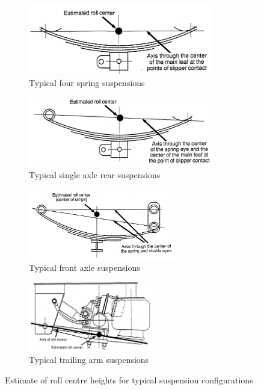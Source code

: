 \begin{figure}
	\centering
	\begin{subfigure}[t]{0.45\textwidth}
		\centering
		\includegraphics[height=1.2in]{fig/winkler-2011_roll-centre-estimation_typical-four-spring-suspensions}
		\caption{Typical four spring suspensions}
	\end{subfigure}%
	\hfill
	\begin{subfigure}[t]{0.45\textwidth}
		\centering
		\includegraphics[height=1.2in]{fig/winkler-2011_roll-centre-estimation_typical-single-axle-rear-suspensions}
		\caption{Typical single axle rear suspensions}
	\end{subfigure}

	\begin{subfigure}[t]{0.45\textwidth}
		\centering
		\includegraphics[height=1.2in]{fig/winkler-2011_roll-centre-estimation_typical-front-axle-suspensions}
		\caption{Typical front axle suspensions}
	\end{subfigure}
	\hfill
	\begin{subfigure}[t]{0.45\textwidth}
		\centering
		\includegraphics[height=1.2in]{fig/winkler-2011_roll-centre-estimation_compliant-trailing-arm-suspensions}
		\caption{Typical trailing arm suspensions}
	\end{subfigure}
	\caption{Estimate of roll centre heights for typical suspension configurations \cite{Winkler2011}}
	\label{figure:estimate-of-roll-centre-heights-for-typical-suspension-configurations}
\end{figure}

